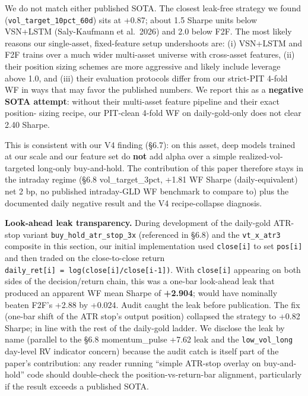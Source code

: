 \documentclass[
]{article}
\begin{document}
We do not match either published SOTA. The closest leak-free strategy we
found (\texttt{vol\_target\_10pct\_60d}) sits at +0.87; about 1.5 Sharpe
units below VSN+LSTM (Saly-Kaufmann et al.~2026) and 2.0 below F2F. The
most likely reasons our single-asset, fixed-feature setup undershoots
are: (i) VSN+LSTM and F2F trains over a much wider multi-asset universe
with cross-asset features, (ii) their position sizing schemes are more
aggressive and likely include leverage above 1.0, and (iii) their
evaluation protocols differ from our strict-PIT 4-fold WF in ways that
may favor the published numbers. We report this as a \textbf{negative
SOTA attempt}: without their multi-asset feature pipeline and their
exact position- sizing recipe, our PIT-clean 4-fold WF on
daily-gold-only does not clear 2.40 Sharpe.

This is consistent with our V4 finding (§6.7): on this asset, deep
models trained at our scale and our feature set do \textbf{not} add
alpha over a simple realized-vol-targeted long-only buy-and-hold. The
contribution of this paper therefore stays in the intraday regime (§6.8
vol\_target\_3pct, +1.81 WF Sharpe (daily-equivalent) net 2 bp, no
published intraday-GLD WF benchmark to compare to) plus the documented
daily negative result and the V4 recipe-collapse diagnosis.

\textbf{Look-ahead leak transparency.} During development of the
daily-gold ATR-stop variant \texttt{buy\_hold\_atr\_stop\_3x}
(referenced in §6.8) and the \texttt{vt\_x\_atr3} composite in this
section, our initial implementation used \texttt{close{[}i{]}} to set
\texttt{pos{[}i{]}} and then traded on the close-to-close return
\texttt{daily\_ret{[}i{]}\ =\ log(close{[}i{]}/close{[}i-1{]})}. With
\texttt{close{[}i{]}} appearing on both sides of the decision/return
chain, this was a one-bar look-ahead leak that produced an apparent WF
mean Sharpe of \textbf{+2.904}; would have nominally beaten F2F's +2.88
by +0.024. Audit caught the leak before publication. The fix (one-bar
shift of the ATR stop's output position) collapsed the strategy to +0.82
Sharpe; in line with the rest of the daily-gold ladder. We disclose the
leak by name (parallel to the §6.8 momentum\_pulse +7.62 leak and the
\texttt{low\_vol\_long} day-level RV indicator concern) because the
audit catch is itself part of the paper's contribution: any reader
running ``simple ATR-stop overlay on buy-and-hold'' code should
double-check the position-vs-return-bar alignment, particularly if the
result exceeds a published SOTA.
\end{document}
